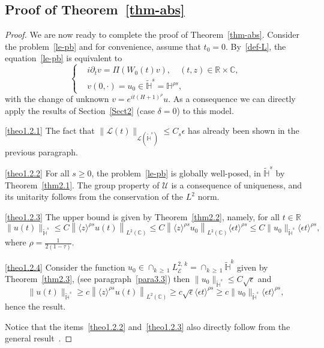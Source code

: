 \documentclass[10pt]{amsart}
\theoremstyle{definition}\newtheorem{defi}[theo]{Definition}\newtheorem{rema}[theo]{Remark}\newtheorem{exam}[theo]{Example}\newtheorem{exem}[theo]{Example}\newtheorem{nota}[theo]{Notation}
\newcommand{\C}{\mathbb{C}}
\newcommand{\R}{\mathbb{R}}
\newcommand{\HH}{\mathbb{H}}
\newcommand{\E}{\mathcal{E}}
\newcommand{\clL}{\mathcal{L}}
\newcommand{\clU}{\mathcal{U}}
\renewcommand{\L}{\mathscr{L}}
\newcommand*\eps{\epsilon}
\newcommand*\dis{\displaystyle}
\newcommand{\<}{\langle}
\renewcommand{\>}{\rangle}
\begin{document}
\subsection{Proof of Theorem~\ref{thm-abs}}
\begin{proof}
We are now ready to complete the proof of Theorem~\ref{thm-abs}. Consider the problem~\eqref{le-pb} and for convenience, assume that $t_0=0$. By~\eqref{def-L}, the equation~\eqref{le-pb} is equivalent to
\[
\begin{cases}
&i\partial_t v= \Pi\left(W_0(t) v\right), \quad (t,z)\in \R\times \C,\\
&v(0,\cdot)= u_0 \in \widetilde{\HH}^{s}={\HH}^{\rho s},
\end{cases}
\]
with the change of unknown $v=e^{it (H+1)^{\rho}}u$. As a consequence we can directly apply the results of Section~\ref{Sect2} (case $\delta=0$) to this model.

\eqref{theo1.2.1} The fact that $\| \L(t) \|_{ \clL(\widetilde{\HH}^{s})} \leq C_s \eps$ has already been shown in the previous paragraph.



\eqref{theo1.2.2} For all $s\geq 0$, the problem~\eqref{le-pb} is globally well-posed, in $\widetilde{\HH}^{s}$ by Theorem~\ref{thm2.1}. The group property of $\clU$ is a consequence of uniqueness, and its unitarity follows from the conservation of the $L^2$ norm.

\eqref{theo1.2.3} The upper bound is given by Theorem~\ref{thm2.2}, namely, for all $t\in \R$
\[
\| u(t)\|_{\widetilde{\HH}^{s}} \leq C \left\|\<z\>^{\rho s} u(t)\right\|_{L^{2}(\C)} \leq C \left\|\<z\>^{\rho s} u_0\right\|_{L^{2}(\C)} \< \eps t\>^{\rho s} \leq C\| u_0\|_{\widetilde{\HH}^{s}} \< \eps t\>^{\rho s},
\]
where $\rho= \tfrac{1}{2(1-\tau)}$.


\eqref{theo1.2.4} Consider the function $\dis u_0 \in \cap_{k\,\geq\,1} L^{2,\,k}_{\E}=
\cap_{k\,\geq\,1} \widetilde{\HH}^{k} $ given by Theorem~\ref{thm2.3}, (see paragraph~\ref{para3.3}) then $\| u_0\|_{\widetilde{\HH}^{s}} \leq C \sqrt{\eps}$ and
\[
\| u(t)\|_{\widetilde{\HH}^{s}} \geq c \left\| \<z\>^{\rho s} u(t)\right\|_{L^2(\C)} \geq c \sqrt{\eps}\<\eps t\>^{\rho s} \geq c\| u_0\|_{\widetilde{\HH}^{s}} \<\eps t\>^{\rho s},
\]
hence the result.

Notice that the items~\eqref{theo1.2.2} and~\eqref{theo1.2.3} also directly follow from the general result~\cite[Theorem~1.5]{MasRo}.
\end{proof}
\end{document}
